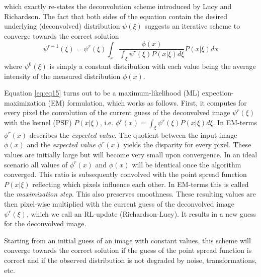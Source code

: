 \documentclass[]{spie}  %
\begin{document}
which exactly re-states the deconvolution scheme introduced by Lucy and Richardson. The fact that both sides of the equation contain the desired underlying (deconvolved) distribution $\psi(\xi)$ suggests an iterative scheme to converge towards the correct solution
\begin{equation}
\label{eq:eq15}
\psi^{r+1}(\xi) = \psi^r(\xi) \int_x \frac{ \phi(x) }{\int_\xi \psi^r(\xi) P(x|\xi) d\xi} P(x|\xi) dx
\end{equation}
where $\psi^0(\xi)$ is simply a constant distribution with each value being the average intensity of the measured distribution $\phi(x)$.

Equation \ref{eq:eq15} turns out to be a maximum-likelihood (ML) expection-maximization (EM) formulation\cite{Dempster77}, which works as follows. First, it computes for every pixel the convolution of the current guess of the deconvolved image $\psi^r(\xi)$ with the kernel (PSF) $P(x|\xi)$, i.e. $\phi^r(x) = \int_\xi \psi^r(\xi) P(x|\xi) d\xi$. In EM-terms $\phi^r(x)$ describes the \emph{expected value}.  The quotient between the input image $\phi(x)$ and the \emph{expected value} $\phi^r(x)$ yields the disparity for every pixel. These values are initially large but will become very small upon convergence. In an ideal scenario all values of $\phi^r(x)$ and $\phi(x)$ will be identical once the algorithm converged. This ratio is subsequently convolved with the point spread function $P(x|\xi)$ reflecting which pixels influence each other. In EM-terms this is called the \emph{maximization step}. This also preserves smoothness. These resulting values are then pixel-wise multiplied with the current guess of the deconvolved image $\psi^r(\xi)$, which we call an RL-update (Richardson-Lucy). It results in a new guess for the deconvolved image.

Starting from an initial guess of an image with constant values, this scheme will converge towards the correct solution if the guess of the point spread function is correct and if the observed distribution is not degraded by noise, transformations, etc.

\end{document}
